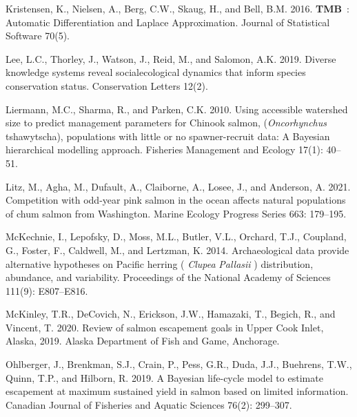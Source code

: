 \documentclass[11pt]{book}
\begin{document}
\begin{CSLReferences}{1}{0}
%
Kristensen, K., Nielsen, A., Berg, C.W., Skaug, H., and Bell, B.M. 2016. {\textbf{TMB}}~: Automatic {Differentiation} and {Laplace Approximation}. Journal of Statistical Software 70(5).

%
Lee, L.C., Thorley, J., Watson, J., Reid, M., and Salomon, A.K. 2019. Diverse knowledge systems reveal social\textendash ecological dynamics that inform species conservation status. Conservation Letters 12(2).

%
Liermann, M.C., Sharma, R., and Parken, C.K. 2010. Using accessible watershed size to predict management parameters for {Chinook} salmon, ({\emph{Oncorhynchus}} tshawytscha), populations with little or no spawner-recruit data: A {Bayesian} hierarchical modelling approach. Fisheries Management and Ecology 17(1): 40--51.

%
Litz, M., Agha, M., Dufault, A., Claiborne, A., Losee, J., and Anderson, A. 2021. Competition with odd-year pink salmon in the ocean affects natural populations of chum salmon from {Washington}. Marine Ecology Progress Series 663: 179--195.

%
McKechnie, I., Lepofsky, D., Moss, M.L., Butler, V.L., Orchard, T.J., Coupland, G., Foster, F., Caldwell, M., and Lertzman, K. 2014. Archaeological data provide alternative hypotheses on {Pacific} herring ( {\emph{Clupea}}{ \emph{Pallasii}} ) distribution, abundance, and variability. Proceedings of the National Academy of Sciences 111(9): E807--E816.

%
McKinley, T.R., DeCovich, N., Erickson, J.W., Hamazaki, T., Begich, R., and Vincent, T. 2020. Review of salmon escapement goals in {Upper Cook Inlet}, {Alaska}, 2019. {Alaska Department of Fish and Game}, {Anchorage}.

%
Ohlberger, J., Brenkman, S.J., Crain, P., Pess, G.R., Duda, J.J., Buehrens, T.W., Quinn, T.P., and Hilborn, R. 2019. A {Bayesian} life-cycle model to estimate escapement at maximum sustained yield in salmon based on limited information. Canadian Journal of Fisheries and Aquatic Sciences 76(2): 299--307.


\end{CSLReferences}
\end{document}
